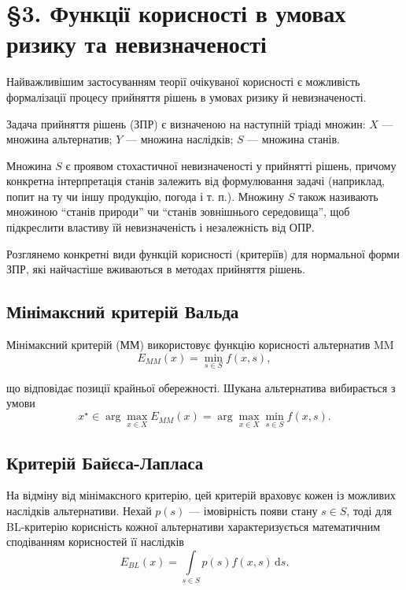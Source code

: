 
\usepackage{pagecolor,xcolor}
\color{yellow}

\pagecolor{black}

\tableofcontents

\section{\S3. Функції корисності в умовах ризику та невизначеності}

Найважливішим застосуванням теорії очікуваної корисності є можливість формалізації процесу прийняття рішень в умовах ризику й невизначеності. \medskip

Задача прийняття рішень (ЗПР) є визначеною на наступній тріаді множин: $X$ --- множина альтернатив; $Y$ --- множина наслідків; $S$ --- множина станів.  \medskip

Множина $S$ є проявом стохастичної невизначеності у прийнятті рішень, причому конкретна інтерпретація станів залежить від формулювання задачі (наприклад, попит на ту чи іншу продукцію, погода і т. п.). Множину $S$ також називають множиною ``станів природи'' чи ``станів зовнішнього середовища'', щоб підкреслити властиву їй невизначеність і незалежність від ОПР. \medskip

Розглянемо конкретні види функцій корисності (критеріїв) для нормальної форми ЗПР, які найчастіше вживаються в методах прийняття рішень.

\subsection{Мінімаксний критерій Вальда}

Мінімаксний критерій (ММ) використовує функцію корисності альтернатив MM 
\[E_{MM}(x) = \min\limits_{s \in S} f(x, s),\]

що відповідає позиції крайньої обережності. Шукана альтернатива вибирається з умови 
\[x^\star \in \arg \max\limits_{x \in X} E_{MM}(x) = \arg \max\limits_{x \in X} \min\limits_{s \in S} f(x, s).\]

\subsection{Критерій Байєса-Лапласа}

На відміну від мінімаксного критерію, цей критерій враховує кожен із можливих наслідків альтернативи. Нехай $p(s)$ --- імовірність появи стану $s \in S$, тоді для BL-критерію корисність кожної альтернативи характеризується математичним сподіванням корисностей її наслідків
\[E_{BL}(x) = \int\limits_{s \in S} p(s) f(x, s) \, \mathrm{d} s.\]

